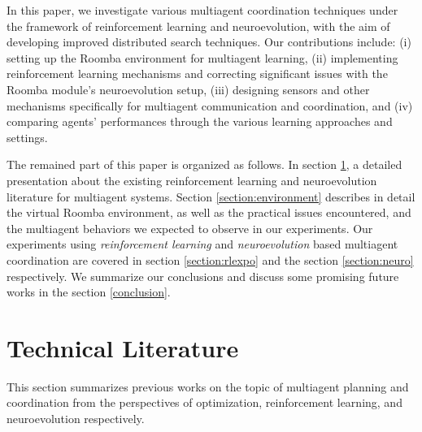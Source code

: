 \documentclass[conference]{IEEEtran}
\begin{document}
In this paper, we
investigate various multiagent coordination techniques under the framework of
reinforcement learning and neuroevolution, with the aim of developing improved
distributed search techniques. 
Our contributions include: 
(i)  setting up the Roomba environment for multiagent learning, 
(ii) implementing reinforcement learning mechanisms and correcting significant issues with the Roomba module's
neuroevolution setup, 
(iii) designing sensors and other mechanisms specifically for multiagent
communication and coordination, and 
(iv) comparing agents' performances through the various learning approaches and
settings.

The remained part of this paper is organized as follows. 
In section \ref{section:literature}, a detailed presentation about the
existing reinforcement learning and neuroevolution literature
for multiagent systems.  
Section \ref{section:environment} describes in detail the virtual Roomba
environment, as well as the practical issues encountered, and the multiagent
behaviors we expected to observe in our experiments.  
Our experiments using 
\textit{reinforcement learning} and \textit{neuroevolution} based
multiagent coordination are covered in section \ref{section:rlexpo}
and the section \ref{section:neuro} respectively.  
We summarize our conclusions and discuss some promising future works in the
section \ref{conclusion}. 



\section{Technical Literature} \label{section:literature}
This section summarizes previous works on the topic of multiagent planning and
coordination from the perspectives of optimization, reinforcement learning,
and neuroevolution respectively.
\end{document}
